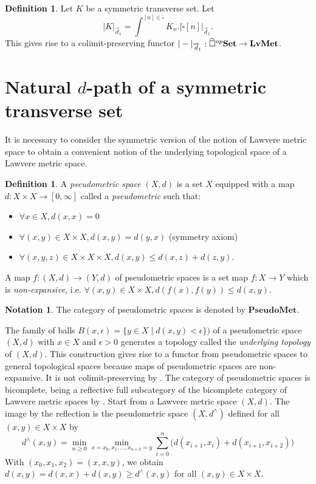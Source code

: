 \documentclass[a4paper,12pt]{amsart}
\newcommand{\p}{\times}
\renewcommand{\vec}{\overrightarrow}
\theoremstyle{definition}
\newtheorem{defn}[thm]{Definition}
\newcommand{\bd}{\begin{defn}}
\newcommand{\ed}{\end{defn}}
\newtheorem{nota}[thm]{Notation}
\renewcommand{\leq}{\leqslant}
\renewcommand{\geq}{\geqslant}
\newcommand{\brm}[1]{{\rm{\mathbf{#1}}}}
\newcommand{\set}{{\brm{Set}}}
\newcommand{\mins}[1]{\texorpdfstring{$#1$}{Lg}}
\newcommand{\vd}{\vec{d}\!_1}
\newcommand{\LMet}{\mathbf{LvMet}}
\newcommand{\SLMet}{\mathbf{PseudoMet}}
\begin{document}
\bd \label{rea-Lawverecube}
Let $K$ be a symmetric transverse set. Let 
\[
|K|_{\vd} = \int^{[n]\in \widehat{\square}} K_n.|\widehat{\square}[n]|_{\vd}.
\]
This gives rise to a colimit-preserving functor $|-|_{\vd}:\widehat{\square}^{op}\set \to \LMet$. 
\ed


\section{Natural \mins{d}-path of a symmetric transverse set}
\label{nat-path}

It is necessary to consider the symmetric version of the notion of Lawvere metric space to obtain a convenient notion of the underlying topological space of a Lawvere metric space.

\bd
A \textit{pseudometric space} $(X,d)$ is a set $X$ equipped with a map $d:X\p X\to [0,\infty]$ called a \textit{pseudometric} such that:
\begin{itemize}
	\item $\forall x\in X,d(x,x)=0$
	\item $\forall (x,y)\in X\p X, d(x,y)=d(y,x)$ (symmetry axiom)
	\item $\forall (x,y,z)\in X\p X\p X, d(x,y)\leq d(x,z)+d(z,y)$.
\end{itemize}
A map $f:(X,d)\to (Y,d)$ of pseudometric spaces is a set map $f:X\to Y$ which is \textit{non-expansive}, i.e. $\forall (x,y)\in X\p X, d(f(x),f(y))\leq d(x,y)$.  
\ed

\begin{nota}
	The category of pseudometric spaces is denoted by $\SLMet$.
\end{nota}


The family of balls $B(x,\epsilon)=\{y\in X\mid d(x,y)<\epsilon\})$ of a pseudometric space $(X,d)$ with $x\in X$ and $\epsilon>0$ generates a topology called the \textit{underlying topology} of $(X,d)$. This construction gives rise to a functor from pseudometric spaces to general topological spaces because maps of pseudometric spaces are non-expansive. It is not colimit-preserving by \cite[Remark~3.30]{zbMATH07226006}. The category of pseudometric spaces is bicomplete, being a reflective full subcategory of the bicomplete category of Lawvere metric spaces by \cite[Proposition~3.21]{zbMATH07226006}. Start from a Lawvere metric space $(X,d)$. The image by the reflection is the pseudometric space $(X,d^\wedge)$ defined for all $(x,y)\in X\p X$ by 
\[
d^\wedge(x,y) = \min\limits_{n\geq 0}\min_{x=x_0,x_1,\dots,x_{n+2}=y}\sum_{i=0}^{n} \bigg(d(x_{i+1},x_i) + d(x_{i+1},x_{i+2})\bigg)
\]
With $(x_0,x_1,x_2)=(x,x,y)$, we obtain $d(x,y)=d(x,x)+d(x,y)\geq d^\wedge(x,y)$ for all $(x,y)\in X\p X$. 
\end{document}

